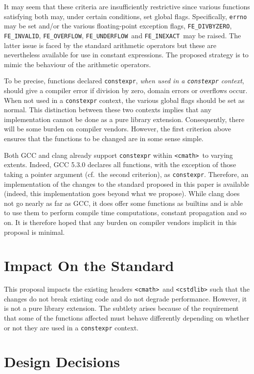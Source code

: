 \documentclass[prd,twocolumn,amsmath,amssymb,nofootinbib,eqsecnum]{revtex4-1}
\newcommand{\constexpr}{\code{constexpr}\xspace}
\newcommand{\code}[1]{{\tt #1}}
\newcommand{\header}[1]{{\tt <#1>}}
\newcommand{\cmath}{\header{cmath}}
\newcommand{\FEINVALID}{{\tt FE\_INVALID}}
\newcommand{\FEDIVBYZERO}{{\tt FE\_DIVBYZERO}}
\newcommand{\FEINEXACT}{{\tt FE\_INEXACT}}
\newcommand{\FEUNDERFLOW}{{\tt FE\_UNDERFLOW}}
\newcommand{\FEOVERFLOW}{{\tt FE\_OVERFLOW}}
\begin{document}
It may seem that these criteria are insufficiently restrictive since various
functions satisfying both may, under certain conditions, set global flags.
Specifically, \code{errno} may be set and/or the various floating-point
exception flags, \FEDIVBYZERO, \FEINVALID, \FEOVERFLOW, \FEUNDERFLOW\ and
\FEINEXACT\ may be raised. The latter issue is 
faced by the standard
arithmetic operators but these are nevertheless available for use in constant
expressions. The proposed strategy is to mimic the behaviour of the arithmetic
operators.

To be precise, functions declared \constexpr, \emph{when used in a \constexpr
context}, should give a compiler error if division by zero, domain errors or
overflows occur. When not used in a \constexpr context, the various global
flags should be set as normal. This distinction between these two contexts
implies that any implementation cannot be done as a pure library extension.
Consequently, there will be some burden on compiler vendors. However, the first
criterion above ensures that the functions to be changed are in some sense
simple.

Both GCC and clang already support \constexpr within \cmath\ to varying extents. 
Indeed, GCC 5.3.0 declares all functions, with the exception of those taking a pointer argument
(cf.\ the second criterion), as \constexpr. Therefore, an implementation of the changes to the standard proposed in this paper is available (indeed, this implementation goes beyond what we propose).
While clang does not go nearly as far as GCC, it does offer some functions as 
builtins and is able to use them to perform compile time computations, constant
propagation and so on. It is therefore hoped that any burden on compiler vendors implicit in this
proposal is minimal.

\section{Impact On the Standard}

This proposal impacts the existing headers \cmath\ and \header{cstdlib} such
that the changes do not break existing code and do not degrade performance.
However, it is not a pure library extension. The subtlety arises because of the
requirement that some of the functions affected must behave differently
depending on whether or not they are used in a \constexpr context.

\section{Design Decisions}
\end{document}
